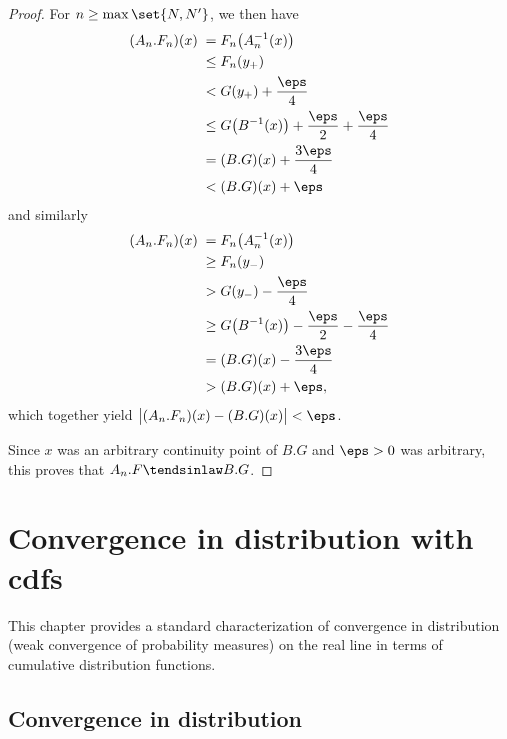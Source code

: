 \begin{proof}
  For $n \ge \max \set{N,N'}$, we then have
  \begin{align*}
    (A_n.F_n)(x) \;
    = \; & F_n \big( A_n^{-1}(x) \big) \\
    \le \; & F_n (y_+) \\
    < \; & G(y_+) + \frac{\eps}{4} \\
    \le \; & G \big( B^{-1}(x) \big) + \frac{\eps}{2} + \frac{\eps}{4} \\
    = \; & (B.G) (x) + \frac{3\eps}{4} \\
    < \; & (B.G) (x) + \eps
  \end{align*}
  and similarly
  \begin{align*}
    (A_n.F_n)(x) \;
    = \; & F_n \big( A_n^{-1}(x) \big) \\
    \ge \; & F_n (y_-) \\
    > \; & G(y_-) - \frac{\eps}{4} \\
    \ge \; & G \big( B^{-1}(x) \big) - \frac{\eps}{2} - \frac{\eps}{4} \\
    = \; & (B.G) (x) - \frac{3\eps}{4} \\
    > \; & (B.G) (x) + \eps ,
  \end{align*}
  which together yield $\big| (A_n.F_n)(x) - (B.G)(x) \big| < \eps$.

  Since $x$ was an arbitrary continuity point of $B.G$ and
  $\eps > 0$ was arbitrary, this proves that $A_n.F \tendsinlaw B.G$.
\end{proof}



\chapter{Convergence in distribution with cdfs}

This chapter provides a standard characterization of convergence in distribution
(weak convergence of probability measures) on the real line in terms of
cumulative distribution functions.

\section{Convergence in distribution}

